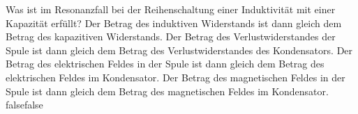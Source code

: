    {Was ist im Resonanzfall bei der Reihenschaltung einer Induktivität mit einer Kapazität erfüllt?}
    {Der Betrag des induktiven Widerstands ist dann gleich dem Betrag des kapazitiven Widerstands.}
    {Der Betrag des Verlustwiderstandes der Spule ist dann gleich dem Betrag des Verlustwiderstandes des Kondensators.}
    {Der Betrag des elektrischen Feldes in der Spule ist dann gleich dem Betrag des elektrischen Feldes im Kondensator.}
    {Der Betrag des magnetischen Feldes in der Spule ist dann gleich dem Betrag des magnetischen Feldes im Kondensator.}
    {false}{false}